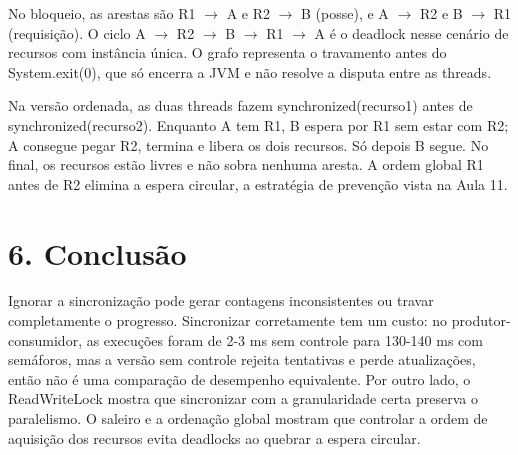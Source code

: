 \documentclass[11pt,a4paper]{article}
\newcommand{\code}[1]{{\small\ttfamily #1}}
\begin{document}
No bloqueio, as arestas são R1 \(\rightarrow\) A e R2 \(\rightarrow\) B (posse), e A \(\rightarrow\) R2 e B \(\rightarrow\) R1 (requisição). O ciclo A \(\rightarrow\) R2 \(\rightarrow\) B \(\rightarrow\) R1 \(\rightarrow\) A é o deadlock nesse cenário de recursos com instância única. O grafo representa o travamento antes do \code{System.\allowbreak{}exit(\allowbreak{}0)}, que só encerra a JVM e não resolve a disputa entre as threads.

Na versão ordenada, as duas threads fazem \code{synchronized(\allowbreak{}recurso1)} antes de \code{synchronized(\allowbreak{}recurso2)}. Enquanto A tem R1, B espera por R1 sem estar com R2; A consegue pegar R2, termina e libera os dois recursos. Só depois B segue. No final, os recursos estão livres e não sobra nenhuma aresta. A ordem global R1 antes de R2 elimina a espera circular, a estratégia de prevenção vista na Aula 11.

\section*{6. Conclusão}
Ignorar a sincronização pode gerar contagens inconsistentes ou travar completamente o progresso. Sincronizar corretamente tem um custo: no produtor-consumidor, as execuções foram de 2-3 ms sem controle para 130-140 ms com semáforos, mas a versão sem controle rejeita tentativas e perde atualizações, então não é uma comparação de desempenho equivalente. Por outro lado, o \code{Read\allowbreak{}Write\allowbreak{}Lock} mostra que sincronizar com a granularidade certa preserva o paralelismo. O saleiro e a ordenação global mostram que controlar a ordem de aquisição dos recursos evita deadlocks ao quebrar a espera circular.
\end{document}
